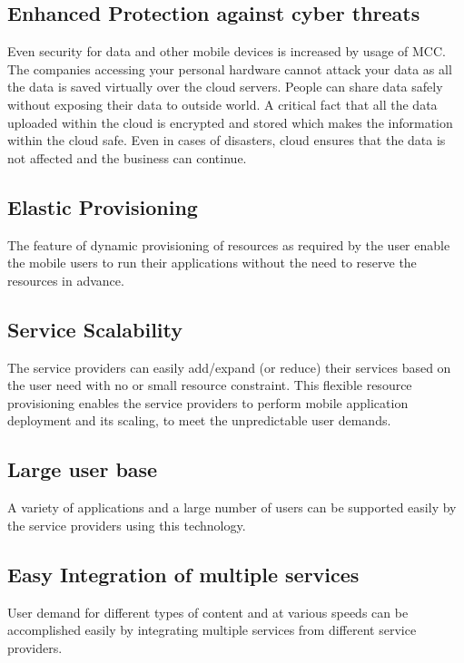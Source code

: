 \documentclass[10pt, conference, compsocconf]{IEEEtran}
\begin{document}
\subsection{Enhanced Protection against cyber threats}
Even security for data and other mobile devices is increased by usage of MCC. The companies accessing your personal hardware cannot attack your data as all the data is saved virtually over the cloud servers. People can share data safely without exposing their data to outside world. A critical fact that all the data uploaded within the cloud is encrypted and stored which makes the information within the cloud safe. Even in cases of disasters, cloud ensures that the data is not affected and the business can continue.

\subsection{Elastic Provisioning}
The feature of dynamic provisioning of resources as required by the user enable the mobile users to run their applications without the need to reserve the resources in advance.

\subsection{Service Scalability}
The service providers can easily add/expand (or reduce) their services based on the user need with no or small resource constraint. This flexible resource provisioning enables the service providers to perform mobile application deployment and its scaling, to meet the unpredictable user demands.

\subsection{Large user base}
A variety of applications and a large number of users can be supported easily by the service providers using this technology.

\subsection{Easy Integration of multiple services}
User demand for different types of content and at various speeds can be accomplished easily by integrating multiple services from different service providers.
\end{document}
